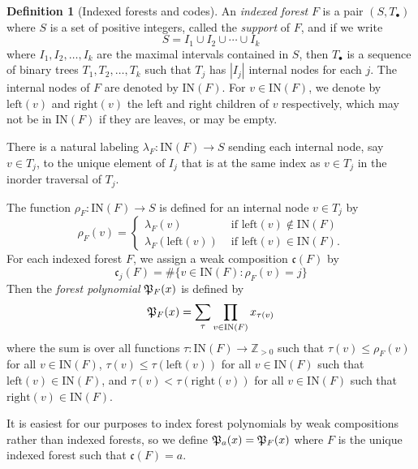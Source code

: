 \documentclass{amsart}
\theoremstyle{definition}
\newtheorem{definition}[lemma]{Definition}
\theoremstyle{remark}
\numberwithin{equation}{subsection}
\newcommand{\code}{\mathfrak{c}}
\begin{document}
\begin{definition}[Indexed forests and codes]
  An \emph{indexed forest} $F$ is a pair $(S, T_\bullet)$ where $S$ is a set of positive integers, called the \emph{support} of $F$, and if we write
  $$S=I_1\cup I_2\cup \cdots \cup I_k$$
  where $I_1,I_2,\ldots, I_k$ are the maximal intervals contained in $S$, then $T_\bullet$ is a sequence of binary trees $T_1,T_2,\ldots, T_k$ such that $T_j$ has $|I_j|$ internal nodes for each $j$. The internal nodes of $F$ are denoted by $\mathrm{IN}(F)$. For $v\in \mathrm{IN}(F)$, we denote by $\mathrm{left}(v)$ and $\mathrm{right}(v)$ the left and right children of $v$ respectively, which may not be in $\mathrm{IN}(F)$ if they are leaves, or may be empty.
  
  There is a natural labeling $\lambda_F:\mathrm{IN}(F)\to S$ sending each internal node, say $v\in T_j$, to the unique element of $I_j$ that is at the same index as $v\in T_j$ in the inorder traversal of $T_j$.
  
  The function $\rho_F:\mathrm{IN}(F)\to S$ is defined for an internal node $v\in T_j$ by 
  $$\rho_F(v) = \begin{cases}
  \lambda_F(v)&\mbox{ if }\mathrm{left}(v)\notin\mathrm{IN}(F)\\
  \lambda_F(\mathrm{left}(v))&\mbox{ if }\mathrm{left}(v)\in\mathrm{IN}(F).
  \end{cases}$$
  For each indexed forest $F$, we assign a weak composition $\code(F)$ by
  $$\code_j(F)=\#\{v\in \mathrm{IN}(F): \rho_F(v)=j\}$$
  Then the \emph{forest polynomial} $\mathfrak{P}_F(x)$ is defined by
  $$\mathfrak{P}_F(x) = \sum_{\tau}\prod_{v\in\mathrm{IN}(F)}x_{\tau(v)}$$
  where the sum is over all functions $\tau:\mathrm{IN}(F)\to \mathbb{Z}_{>0}$ such that $\tau(v)\leq \rho_F(v)$ for all $v\in \mathrm{IN}(F)$, $\tau(v)\leq\tau(\mathrm{left}(v))$ for all $v\in \mathrm{IN}(F)$ such that $\mathrm{left}(v)\in \mathrm{IN}(F)$, and $\tau(v)<\tau(\mathrm{right}(v))$ for all $v\in \mathrm{IN}(F)$ such that $\mathrm{right}(v)\in \mathrm{IN}(F)$.

  It is easiest for our purposes to index forest polynomials by weak compositions rather than indexed forests, so we define $\mathfrak{P}_a(x) = \mathfrak{P}_F(x)$ where $F$ is the unique indexed forest such that $\code(F) = a$.
\end{definition}
\end{document}
